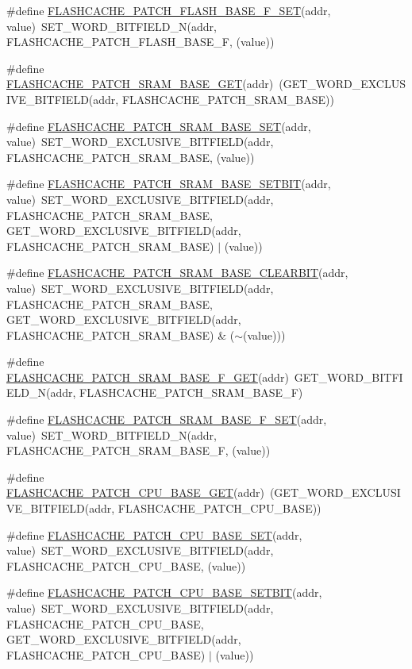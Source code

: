 \begin{DoxyCompactItemize}
\item 
\#define \hyperlink{a00549_a68e2478f1433e4bce86d2f8573bea85f}{FLASHCACHE\_\-PATCH\_\-FLASH\_\-BASE\_\-F\_\-SET}(addr, value)~SET\_\-WORD\_\-BITFIELD\_\-N(addr, FLASHCACHE\_\-PATCH\_\-FLASH\_\-BASE\_\-F, (value))
\item 
\#define \hyperlink{a00549_abca1f3f7fd39ef185eed6862fd8b13b5}{FLASHCACHE\_\-PATCH\_\-SRAM\_\-BASE\_\-GET}(addr)~(GET\_\-WORD\_\-EXCLUSIVE\_\-BITFIELD(addr, FLASHCACHE\_\-PATCH\_\-SRAM\_\-BASE))
\item 
\#define \hyperlink{a00549_abd964014fe52c471fd6618141b289160}{FLASHCACHE\_\-PATCH\_\-SRAM\_\-BASE\_\-SET}(addr, value)~SET\_\-WORD\_\-EXCLUSIVE\_\-BITFIELD(addr, FLASHCACHE\_\-PATCH\_\-SRAM\_\-BASE, (value))
\item 
\#define \hyperlink{a00549_a598be99cf53f08ac0763107bfe55b04f}{FLASHCACHE\_\-PATCH\_\-SRAM\_\-BASE\_\-SETBIT}(addr, value)~SET\_\-WORD\_\-EXCLUSIVE\_\-BITFIELD(addr, FLASHCACHE\_\-PATCH\_\-SRAM\_\-BASE, GET\_\-WORD\_\-EXCLUSIVE\_\-BITFIELD(addr, FLASHCACHE\_\-PATCH\_\-SRAM\_\-BASE) $|$ (value))
\item 
\#define \hyperlink{a00549_a058840424ca162ecc9a25428c9d3018c}{FLASHCACHE\_\-PATCH\_\-SRAM\_\-BASE\_\-CLEARBIT}(addr, value)~SET\_\-WORD\_\-EXCLUSIVE\_\-BITFIELD(addr, FLASHCACHE\_\-PATCH\_\-SRAM\_\-BASE, GET\_\-WORD\_\-EXCLUSIVE\_\-BITFIELD(addr, FLASHCACHE\_\-PATCH\_\-SRAM\_\-BASE) \& ($\sim$(value)))
\item 
\#define \hyperlink{a00549_a659b69f4339e5ac2526da4f2abadd4bd}{FLASHCACHE\_\-PATCH\_\-SRAM\_\-BASE\_\-F\_\-GET}(addr)~GET\_\-WORD\_\-BITFIELD\_\-N(addr, FLASHCACHE\_\-PATCH\_\-SRAM\_\-BASE\_\-F)
\item 
\#define \hyperlink{a00549_a93ff178276383e7213db898e76969a96}{FLASHCACHE\_\-PATCH\_\-SRAM\_\-BASE\_\-F\_\-SET}(addr, value)~SET\_\-WORD\_\-BITFIELD\_\-N(addr, FLASHCACHE\_\-PATCH\_\-SRAM\_\-BASE\_\-F, (value))
\item 
\#define \hyperlink{a00549_a82707e9269b5d84ed7ca7f0d200e2450}{FLASHCACHE\_\-PATCH\_\-CPU\_\-BASE\_\-GET}(addr)~(GET\_\-WORD\_\-EXCLUSIVE\_\-BITFIELD(addr, FLASHCACHE\_\-PATCH\_\-CPU\_\-BASE))
\item 
\#define \hyperlink{a00549_a11991972de818a91c980c839ac125b78}{FLASHCACHE\_\-PATCH\_\-CPU\_\-BASE\_\-SET}(addr, value)~SET\_\-WORD\_\-EXCLUSIVE\_\-BITFIELD(addr, FLASHCACHE\_\-PATCH\_\-CPU\_\-BASE, (value))
\item 
\#define \hyperlink{a00549_ac0f2c97a406d6405e6498b3066e42bf7}{FLASHCACHE\_\-PATCH\_\-CPU\_\-BASE\_\-SETBIT}(addr, value)~SET\_\-WORD\_\-EXCLUSIVE\_\-BITFIELD(addr, FLASHCACHE\_\-PATCH\_\-CPU\_\-BASE, GET\_\-WORD\_\-EXCLUSIVE\_\-BITFIELD(addr, FLASHCACHE\_\-PATCH\_\-CPU\_\-BASE) $|$ (value))

\end{DoxyCompactItemize}
